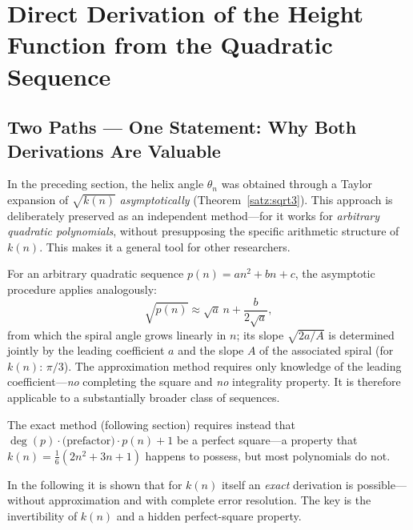 \section{Direct Derivation of the Height Function from the Quadratic Sequence}
\label{sec:hoehenherleitung}

\subsection{Two Paths --- One Statement: Why Both Derivations Are Valuable}

In the preceding section, the helix angle $\theta_n$ was obtained
through a Taylor expansion of $\sqrt{k(n)}$ \emph{asymptotically}
(Theorem~\ref{satz:sqrt3}). This approach is deliberately preserved
as an independent method---for it works for \emph{arbitrary
quadratic polynomials}, without presupposing the specific arithmetic
structure of $k(n)$. This makes it a general tool for other researchers.

\begin{tcolorbox}[
  colback=green!4, colframe=green!40!black, enhanced,
  title={Methodological Note for Other Polynomials}]
For an arbitrary quadratic sequence $p(n) = an^2 + bn + c$, the
asymptotic procedure applies analogously:
\[
  \sqrt{p(n)} \approx \sqrt{a}\,n + \frac{b}{2\sqrt{a}},
\]
from which the spiral angle grows linearly in $n$; its slope $\sqrt{2a/A}$ is determined jointly by the leading coefficient $a$ and the slope $A$ of the associated spiral (for $k(n)$: $\pi/3$). The approximation method requires only knowledge of the
leading coefficient---\emph{no} completing the square and \emph{no}
integrality property. It is therefore applicable to a substantially
broader class of sequences.

The exact method (following section) requires instead that
$\deg(p) \cdot \text{(prefactor)} \cdot p(n) + 1$ be a perfect
square---a property that $k(n) = \tfrac{1}{6}(2n^2+3n+1)$
happens to possess, but most polynomials do not.
\end{tcolorbox}

In the following it is shown that for $k(n)$ itself an \emph{exact}
derivation is possible---without approximation and with complete
error resolution. The key is the invertibility of $k(n)$
and a hidden perfect-square property.


